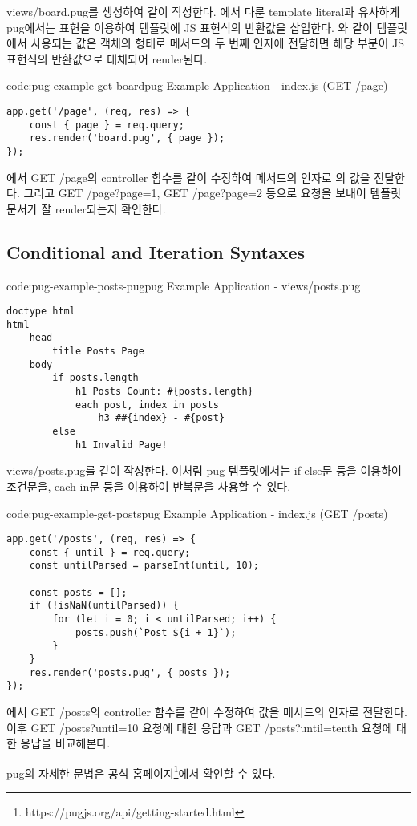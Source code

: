 views/board.pug를 생성하여 \와 같이 작성한다. 에서 다룬 template literal과 유사하게 pug에서는 \cd{\#\{\}} 표현을 이용하여 템플릿에 JS 표현식의 반환값을 삽입한다. 와 같이 템플릿에서 사용되는 값은 객체의 형태로  메서드의 두 번째 인자에 전달하면 해당 부분이 JS 표현식의 반환값으로 대체되어 render된다.

\begin{code}{code:pug-example-get-board}{pug Example Application - index.js (GET /page)}
\begin{verbatim}
app.get('/page', (req, res) => {
    const { page } = req.query;
    res.render('board.pug', { page });
});
\end{verbatim}
\end{code}

에서 GET /page의 controller 함수를 \와 같이 수정하여  메서드의 인자로 의 값을 전달한다. 그리고 GET /page?page=1, GET /page?page=2 등으로 요청을 보내어 템플릿 문서가 잘 render되는지 확인한다.
\clearpage

\subsection*{Conditional and Iteration Syntaxes}

\begin{code}{code:pug-example-posts-pug}{pug Example Application - views/posts.pug}
\begin{verbatim}
doctype html
html
    head
        title Posts Page
    body
        if posts.length
            h1 Posts Count: #{posts.length}
            each post, index in posts
                h3 ##{index} - #{post}
        else
            h1 Invalid Page!
\end{verbatim}
\end{code}

views/posts.pug를 \와 같이 작성한다. 이처럼 pug 템플릿에서는 if-else문 등을 이용하여 조건문을, each-in문 등을 이용하여 반복문을 사용할 수 있다.

\begin{code}{code:pug-example-get-posts}{pug Example Application - index.js (GET /posts)}
\begin{verbatim}
app.get('/posts', (req, res) => {
    const { until } = req.query;
    const untilParsed = parseInt(until, 10);

    const posts = [];
    if (!isNaN(untilParsed)) {
        for (let i = 0; i < untilParsed; i++) {
            posts.push(`Post ${i + 1}`);
        }
    }
    res.render('posts.pug', { posts });
});
\end{verbatim}
\end{code}

에서 GET /posts의 controller 함수를 \와 같이 수정하여  값을  메서드의 인자로 전달한다. 이후 GET /posts?until=10 요청에 대한 응답과 GET /posts?until=tenth 요청에 대한 응답을 비교해본다.

pug의 자세한 문법은 공식 홈페이지\footnote{https://pugjs.org/api/getting-started.html}에서 확인할 수 있다.
